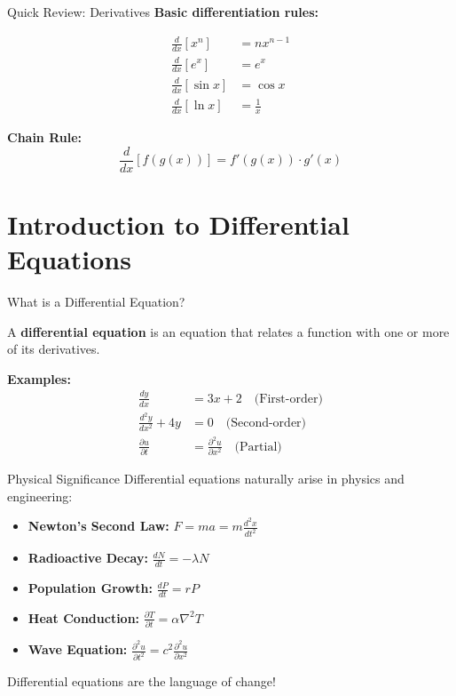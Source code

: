 \documentclass[10pt,aspectratio=169]{beamer}
\begin{document}
\begin{frame}{Quick Review: Derivatives}
    \textbf{Basic differentiation rules:}
    
    \begin{align}
        \frac{d}{dx}[x^n] &= nx^{n-1} \\
        \frac{d}{dx}[e^x] &= e^x \\
        \frac{d}{dx}[\sin x] &= \cos x \\
        \frac{d}{dx}[\ln x] &= \frac{1}{x}
    \end{align}
    
    \textbf{Chain Rule:}
    \begin{equation}
        \frac{d}{dx}[f(g(x))] = f'(g(x)) \cdot g'(x)
    \end{equation}
\end{frame}

\section{Introduction to Differential Equations}

\begin{frame}{What is a Differential Equation?}
    \begin{definition}
        A \textbf{differential equation} is an equation that relates a function with one or more of its derivatives.
    \end{definition}
    
    \textbf{Examples:}
    \begin{align}
        \frac{dy}{dx} &= 3x + 2 \quad \text{(First-order)} \\
        \frac{d^2y}{dx^2} + 4y &= 0 \quad \text{(Second-order)} \\
        \frac{\partial u}{\partial t} &= \frac{\partial^2 u}{\partial x^2} \quad \text{(Partial)}
    \end{align}
\end{frame}

\begin{frame}{Physical Significance}
    Differential equations naturally arise in physics and engineering:
    
    \begin{itemize}
        \item \textbf{Newton's Second Law:} $F = ma = m\frac{d^2x}{dt^2}$
        \item \textbf{Radioactive Decay:} $\frac{dN}{dt} = -\lambda N$
        \item \textbf{Population Growth:} $\frac{dP}{dt} = rP$
        \item \textbf{Heat Conduction:} $\frac{\partial T}{\partial t} = \alpha \nabla^2 T$
        \item \textbf{Wave Equation:} $\frac{\partial^2 u}{\partial t^2} = c^2 \frac{\partial^2 u}{\partial x^2}$
    \end{itemize}
    
    \alert{Differential equations are the language of change!}
\end{frame}
\end{document}
